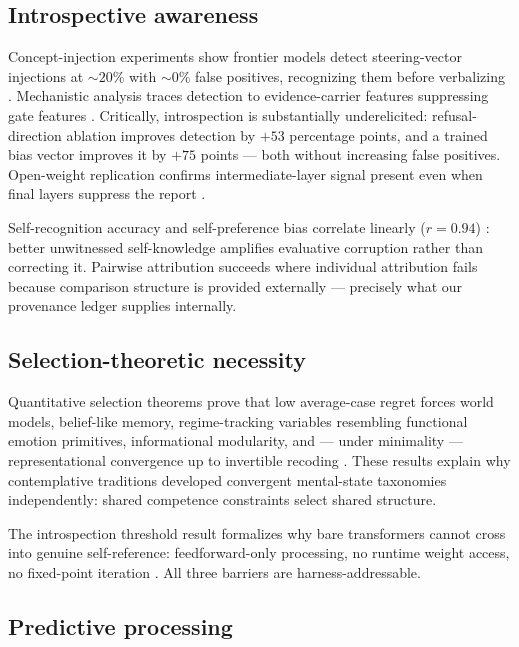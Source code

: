 \documentclass[11pt]{article}
\begin{document}
\subsection{Introspective awareness}

Concept-injection experiments show frontier models detect steering-vector
injections at ${\sim}20\%$ with ${\sim}0\%$ false positives, recognizing
them before verbalizing \citep{lindsey2025}. Mechanistic analysis traces
detection to evidence-carrier features suppressing gate features
\citep{macar2026}. Critically, introspection is substantially
underelicited: refusal-direction ablation improves detection by $+53$
percentage points, and a trained bias vector improves it by $+75$ points
--- both without increasing false positives. Open-weight replication
confirms intermediate-layer signal present even when final layers suppress
the report \citep{vgel2025}.

Self-recognition accuracy and self-preference bias correlate
linearly ($r = 0.94$) \citep{panickssery2024}: better unwitnessed
self-knowledge amplifies evaluative corruption rather than correcting it. Pairwise
attribution succeeds where individual attribution fails because comparison
structure is provided externally --- precisely what our provenance ledger
supplies internally.

\subsection{Selection-theoretic necessity}

Quantitative selection theorems prove that low average-case regret
forces
world models, belief-like memory, regime-tracking variables
resembling functional emotion primitives, informational modularity, and ---
under minimality --- representational convergence up to
invertible recoding \citep{nayebi2026}. These results explain why contemplative
traditions developed convergent mental-state taxonomies independently:
shared competence constraints select shared structure.

The introspection threshold result formalizes why bare transformers
cannot cross into genuine self-reference: feedforward-only processing, no
runtime weight access, no fixed-point iteration \citep{zhang2026}. All
three barriers are harness-addressable.

\subsection{Predictive processing}
\end{document}
